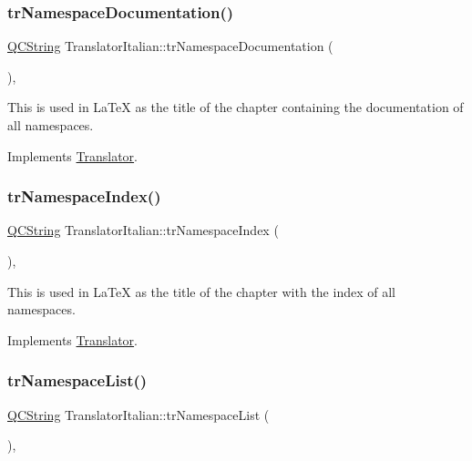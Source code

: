 \subsubsection{\texorpdfstring{trNamespaceDocumentation()}{trNamespaceDocumentation()}}
{\footnotesize\ttfamily \mbox{\hyperlink{class_q_c_string}{Q\+C\+String}} Translator\+Italian\+::tr\+Namespace\+Documentation (\begin{DoxyParamCaption}{ }\end{DoxyParamCaption})\hspace{0.3cm}{\ttfamily [inline]}, {\ttfamily [virtual]}}

This is used in La\+TeX as the title of the chapter containing the documentation of all namespaces. 

Implements \mbox{\hyperlink{class_translator}{Translator}}.

\mbox{\label{class_translator_italian_ac79e16f18e9992121aaf8bf1b4f83ea1}} 
\subsubsection{\texorpdfstring{trNamespaceIndex()}{trNamespaceIndex()}}
{\footnotesize\ttfamily \mbox{\hyperlink{class_q_c_string}{Q\+C\+String}} Translator\+Italian\+::tr\+Namespace\+Index (\begin{DoxyParamCaption}{ }\end{DoxyParamCaption})\hspace{0.3cm}{\ttfamily [inline]}, {\ttfamily [virtual]}}

This is used in La\+TeX as the title of the chapter with the index of all namespaces. 

Implements \mbox{\hyperlink{class_translator}{Translator}}.

\mbox{\label{class_translator_italian_a3c1e6c0da10511984e141019a7b8fc39}} 
\subsubsection{\texorpdfstring{trNamespaceList()}{trNamespaceList()}}
{\footnotesize\ttfamily \mbox{\hyperlink{class_q_c_string}{Q\+C\+String}} Translator\+Italian\+::tr\+Namespace\+List (\begin{DoxyParamCaption}{ }\end{DoxyParamCaption})\hspace{0.3cm}{\ttfamily [inline]}, {\ttfamily [virtual]}}

